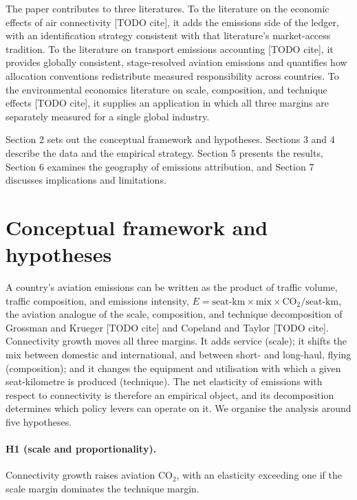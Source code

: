 \documentclass[12pt]{article}
\begin{document}
The paper contributes to three literatures. To the literature on the
economic effects of air connectivity [TODO cite], it adds the emissions side
of the ledger, with an identification strategy consistent with that
literature's market-access tradition. To the literature on transport
emissions accounting [TODO cite], it provides globally consistent,
stage-resolved aviation emissions and quantifies how allocation conventions
redistribute measured responsibility across countries. To the environmental
economics literature on scale, composition, and technique effects [TODO
cite], it supplies an application in which all three margins are separately
measured for a single global industry.

Section 2 sets out the conceptual framework and hypotheses. Sections 3 and 4
describe the data and the empirical strategy. Section 5 presents the
results, Section 6 examines the geography of emissions attribution, and
Section 7 discusses implications and limitations.

\section{Conceptual framework and hypotheses}
A country's aviation emissions can be written as the product of traffic
volume, traffic composition, and emissions intensity,
$E = \text{seat-km} \times \text{mix} \times \mathrm{CO_2/seat\mbox{-}km}$,
the aviation analogue of the scale, composition, and technique decomposition
of Grossman and Krueger [TODO cite] and Copeland and Taylor [TODO cite].
Connectivity growth moves all three margins. It adds service (scale); it
shifts the mix between domestic and international, and between short- and
long-haul, flying (composition); and it changes the equipment and
utilisation with which a given seat-kilometre is produced (technique). The
net elasticity of emissions with respect to connectivity is therefore an
empirical object, and its decomposition determines which policy levers can
operate on it. We organise the analysis around five hypotheses.

\paragraph{H1 (scale and proportionality).} Connectivity growth raises
aviation CO$_2$, with an elasticity exceeding one if the scale margin
dominates the technique margin.
\end{document}
